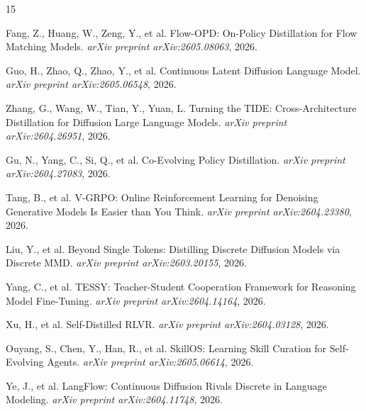 \documentclass[11pt]{article}
\begin{document}
\begin{thebibliography}{15}

Fang, Z., Huang, W., Zeng, Y., et al.
\newblock Flow-OPD: On-Policy Distillation for Flow Matching Models.
\newblock \emph{arXiv preprint arXiv:2605.08063}, 2026.

Guo, H., Zhao, Q., Zhao, Y., et al.
\newblock Continuous Latent Diffusion Language Model.
\newblock \emph{arXiv preprint arXiv:2605.06548}, 2026.

Zhang, G., Wang, W., Tian, Y., Yuan, L.
\newblock Turning the TIDE: Cross-Architecture Distillation for Diffusion Large Language Models.
\newblock \emph{arXiv preprint arXiv:2604.26951}, 2026.

Gu, N., Yang, C., Si, Q., et al.
\newblock Co-Evolving Policy Distillation.
\newblock \emph{arXiv preprint arXiv:2604.27083}, 2026.

Tang, B., et al.
\newblock V-GRPO: Online Reinforcement Learning for Denoising Generative Models Is Easier than You Think.
\newblock \emph{arXiv preprint arXiv:2604.23380}, 2026.

Liu, Y., et al.
\newblock Beyond Single Tokens: Distilling Discrete Diffusion Models via Discrete MMD.
\newblock \emph{arXiv preprint arXiv:2603.20155}, 2026.

Yang, C., et al.
\newblock TESSY: Teacher-Student Cooperation Framework for Reasoning Model Fine-Tuning.
\newblock \emph{arXiv preprint arXiv:2604.14164}, 2026.

Xu, H., et al.
\newblock Self-Distilled RLVR.
\newblock \emph{arXiv preprint arXiv:2604.03128}, 2026.

Ouyang, S., Chen, Y., Han, R., et al.
\newblock SkillOS: Learning Skill Curation for Self-Evolving Agents.
\newblock \emph{arXiv preprint arXiv:2605.06614}, 2026.

Ye, J., et al.
\newblock LangFlow: Continuous Diffusion Rivals Discrete in Language Modeling.
\newblock \emph{arXiv preprint arXiv:2604.11748}, 2026.

\end{thebibliography}
\end{document}
